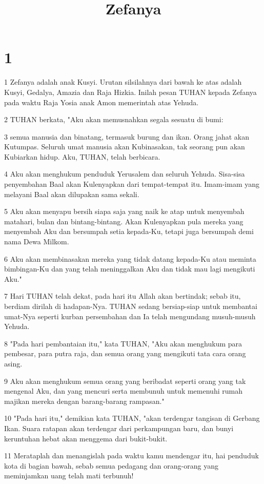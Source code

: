 

\title{Zefanya}


\chapter{1}

\par 1 Zefanya adalah anak Kusyi. Urutan silsilahnya dari bawah ke atas adalah Kusyi, Gedalya, Amazia dan Raja Hizkia. Inilah pesan TUHAN kepada Zefanya pada waktu Raja Yosia anak Amon memerintah atas Yehuda.
\par 2 TUHAN berkata, "Aku akan memusnahkan segala sesuatu di bumi:
\par 3 semua manusia dan binatang, termasuk burung dan ikan. Orang jahat akan Kutumpas. Seluruh umat manusia akan Kubinasakan, tak seorang pun akan Kubiarkan hidup. Aku, TUHAN, telah berbicara.
\par 4 Aku akan menghukum penduduk Yerusalem dan seluruh Yehuda. Sisa-sisa penyembahan Baal akan Kulenyapkan dari tempat-tempat itu. Imam-imam yang melayani Baal akan dilupakan sama sekali.
\par 5 Aku akan menyapu bersih siapa saja yang naik ke atap untuk menyembah matahari, bulan dan bintang-bintang. Akan Kulenyapkan pula mereka yang menyembah Aku dan bersumpah setia kepada-Ku, tetapi juga bersumpah demi nama Dewa Milkom.
\par 6 Aku akan membinasakan mereka yang tidak datang kepada-Ku atau meminta bimbingan-Ku dan yang telah meninggalkan Aku dan tidak mau lagi mengikuti Aku."
\par 7 Hari TUHAN telah dekat, pada hari itu Allah akan bertindak; sebab itu, berdiam dirilah di hadapan-Nya. TUHAN sedang bersiap-siap untuk membantai umat-Nya seperti kurban persembahan dan Ia telah mengundang musuh-musuh Yehuda.
\par 8 "Pada hari pembantaian itu," kata TUHAN, "Aku akan menghukum para pembesar, para putra raja, dan semua orang yang mengikuti tata cara orang asing.
\par 9 Aku akan menghukum semua orang yang beribadat seperti orang yang tak mengenal Aku, dan yang mencuri serta membunuh untuk memenuhi rumah majikan mereka dengan barang-barang rampasan."
\par 10 "Pada hari itu," demikian kata TUHAN, "akan terdengar tangisan di Gerbang Ikan. Suara ratapan akan terdengar dari perkampungan baru, dan bunyi keruntuhan hebat akan menggema dari bukit-bukit.
\par 11 Merataplah dan menangislah pada waktu kamu mendengar itu, hai penduduk kota di bagian bawah, sebab semua pedagang dan orang-orang yang meminjamkan uang telah mati terbunuh!
